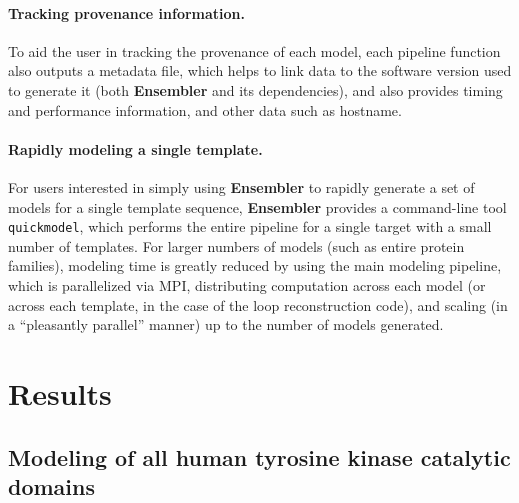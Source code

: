 \documentclass[10pt,letterpaper]{article}
\begin{document}
\paragraph{Tracking provenance information.}
To aid the user in tracking the provenance of each model, each pipeline function also outputs a metadata file, which helps to link data to the software version used to generate it (both {\bf Ensembler} and its dependencies), and also provides timing and performance information, and other data such as hostname.

\paragraph{Rapidly modeling a single template.}
For users interested in simply using {\bf Ensembler} to rapidly generate a set of models for a single template sequence, {\bf Ensembler} provides a command-line tool {\tt quickmodel}, which performs the entire pipeline for a single target with a small number of templates.
For larger numbers of models (such as entire protein families), modeling time is greatly reduced by using the main modeling pipeline, which is parallelized via MPI, distributing computation across each model (or across each template, in the case of the loop reconstruction code), and scaling (in a ``pleasantly parallel'' manner) up to the number of models generated.

\label{section:design}

\section*{Results}
\label{section:results}

\subsection*{Modeling of all human tyrosine kinase catalytic domains}
\end{document}
